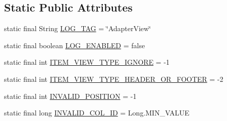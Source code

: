 \subsection*{Static Public Attributes}
\begin{DoxyCompactItemize}
\item 
static final String \hyperlink{classit_1_1sephiroth_1_1android_1_1library_1_1widget_1_1_adapter_view_a2b590b1076e8aefd5a18d74bf4f8c81e}{L\+O\+G\+\_\+\+T\+AG} = \char`\"{}Adapter\+View\char`\"{}
\item 
static final boolean \hyperlink{classit_1_1sephiroth_1_1android_1_1library_1_1widget_1_1_adapter_view_a41273b025f7c8c44cf9687a23f073ffb}{L\+O\+G\+\_\+\+E\+N\+A\+B\+L\+ED} = false
\item 
static final int \hyperlink{classit_1_1sephiroth_1_1android_1_1library_1_1widget_1_1_adapter_view_abea84379580f9c5375325ff2219c4e0a}{I\+T\+E\+M\+\_\+\+V\+I\+E\+W\+\_\+\+T\+Y\+P\+E\+\_\+\+I\+G\+N\+O\+RE} = -\/1
\item 
static final int \hyperlink{classit_1_1sephiroth_1_1android_1_1library_1_1widget_1_1_adapter_view_a7810814dfa86e2d7b3c0ee902a5a146c}{I\+T\+E\+M\+\_\+\+V\+I\+E\+W\+\_\+\+T\+Y\+P\+E\+\_\+\+H\+E\+A\+D\+E\+R\+\_\+\+O\+R\+\_\+\+F\+O\+O\+T\+ER} = -\/2
\item 
static final int \hyperlink{classit_1_1sephiroth_1_1android_1_1library_1_1widget_1_1_adapter_view_a2751b7d592638baeaf149f6da0d4e598}{I\+N\+V\+A\+L\+I\+D\+\_\+\+P\+O\+S\+I\+T\+I\+ON} = -\/1
\item 
static final long \hyperlink{classit_1_1sephiroth_1_1android_1_1library_1_1widget_1_1_adapter_view_a4652ef84c3de9de7d3697a29e2bb96c6}{I\+N\+V\+A\+L\+I\+D\+\_\+\+C\+O\+L\+\_\+\+ID} = Long.\+M\+I\+N\+\_\+\+V\+A\+L\+UE
\end{DoxyCompactItemize}
